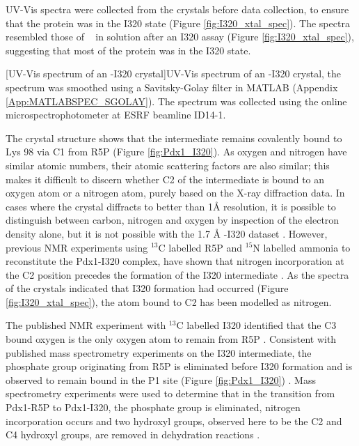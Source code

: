 UV-Vis spectra were collected from the crystals before data collection, to ensure that the protein was in the I320 state (Figure \ref{fig:I320_xtal_spec}). The spectra resembled those of \atpdx~ in solution after an I320 assay (Figure \ref{fig:I320_xtal_spec}), suggesting that most of the protein was in the I320 state.

\begin{minipage}{\linewidth}
	[UV-Vis spectrum of an \atpdx -I320 crystal]{UV-Vis spectrum of an \atpdx -I320 crystal, the spectrum was smoothed using a Savitsky-Golay filter in MATLAB (Appendix \ref{App:MATLABSPEC_SGOLAY}). The spectrum was collected using the online microspectrophotometer at ESRF beamline ID14-1.\label{fig:I320_xtal_spec}} 		
\end{minipage}

The crystal structure shows that the intermediate remains covalently bound to Lys 98 via C1 from R5P (Figure \ref{fig:Pdx1_I320}). As oxygen and nitrogen have similar atomic numbers, their atomic scattering factors are also similar; this makes it difficult to discern whether C2 of the intermediate is bound to an oxygen atom or a nitrogen atom, purely based on the X-ray diffraction data. In cases where the crystal diffracts to better than 1\si{\angstrom} resolution, it is possible to distinguish between carbon, nitrogen and oxygen by inspection of the electron density alone, but it is not possible with the 1.7 \si{\angstrom} \atpdx -I320 dataset \cite{Betzel2001}. However, previous NMR experiments using $^{13}$C labelled R5P and $^{15}$N labelled ammonia to reconstitute the Pdx1-I320 complex, have shown that nitrogen incorporation at the C2 position precedes the formation of the I320 intermediate \cite{Hanes2008b}. As the spectra of the crystals indicated that I320 formation had occurred (Figure \ref{fig:I320_xtal_spec}), the atom bound to C2 has been modelled as nitrogen.  

The published NMR experiment with $^{13}$C labelled I320 identified that the C3 bound oxygen is the only oxygen atom to remain from R5P \cite{Hanes2008b}. Consistent with published mass spectrometry experiments on the I320 intermediate, the phosphate group originating from R5P is eliminated before I320 formation and is observed to remain bound in the P1 site (Figure \ref{fig:Pdx1_I320}) \cite{Hanes2008a}. Mass spectrometry experiments were used to determine that in the transition from Pdx1-R5P to Pdx1-I320, the phosphate group is eliminated, nitrogen incorporation occurs and two hydroxyl groups, observed here to be the C2 and C4 hydroxyl groups, are removed in dehydration reactions \cite{Hanes2008b,Hanes2008a}.   
  

